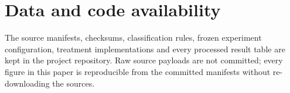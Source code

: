 \documentclass[a4paper,fleqn]{cas-dc}
\begin{document}
\section*{Data and code availability}

The source manifests, checksums, classification rules, frozen experiment
configuration, treatment implementations and every processed result table are
kept in the project repository. Raw source payloads are not committed;
every figure in this paper is reproducible from the committed manifests without
re-downloading the sources.

\printcredits



\end{document}
